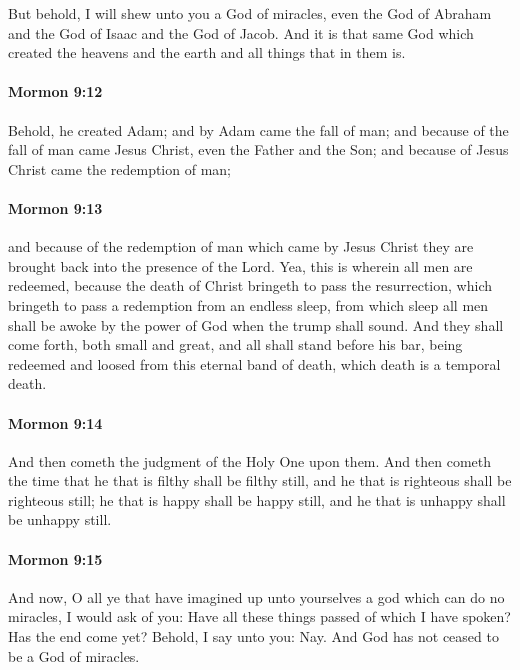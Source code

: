 			But behold, I will shew unto you a God of miracles,
			even the God of Abraham and the God of Isaac and the God of Jacob.
			And it is that same God
			which created the heavens and the earth and all things that in them is.

		\paragraph{Mormon 9:12} %
			\label{MORMON-9-12}

			Behold, he created Adam;
			and by Adam came the fall of man;
			and because of the fall of man came Jesus Christ,
			even the Father and the Son;
			and because of Jesus Christ came the redemption of man;

		\paragraph{Mormon 9:13} %
			\label{MORMON-9-13}

			and because of the redemption of man which came by Jesus Christ
			they are brought back into the presence of the Lord.
			Yea, this is wherein all men are redeemed,
			because the death of Christ bringeth to pass the resurrection,
			which bringeth to pass a redemption from an endless sleep,
			from which sleep all men shall be awoke by the power of God
			when the trump shall sound.
			And they shall come forth, both small and great,
			and all shall stand before his bar,
			being redeemed and loosed from this eternal band of death,
			which death is a temporal death.

		\paragraph{Mormon 9:14} %
			\label{MORMON-9-14}

			And then cometh the judgment of the Holy One upon them.
			And then cometh the time
			that he that is filthy shall be filthy still,
			and he that is righteous shall be righteous still;
			he that is happy shall be happy still,
			and he that is unhappy shall be unhappy still.

		\paragraph{Mormon 9:15} %
			\label{MORMON-9-15}

			And now, O all ye that have imagined up unto yourselves
			a god which can do no miracles,
			I would ask of you:
			Have all these things passed of which I have spoken?
			Has the end come yet?
			Behold, I say unto you: Nay.
			And God has not ceased to be a God of miracles.

